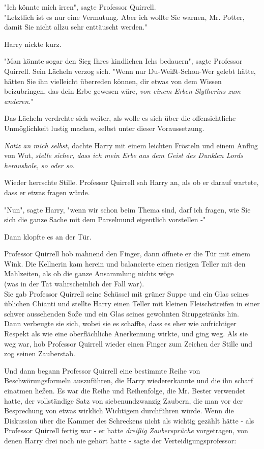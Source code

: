 {"Ich könnte mich irren", sagte Professor Quirrell.\\ "Letztlich ist es nur eine Vermutung. Aber ich wollte Sie warnen, Mr. Potter, damit Sie nicht allzu sehr enttäuscht werden."

Harry nickte kurz.

"Man könnte sogar den Sieg Ihres kindlichen Ichs bedauern", sagte Professor Quirrell. Sein Lächeln verzog sich. "Wenn nur Du-Weißt-Schon-Wer gelebt hätte, hätten Sie ihn vielleicht überreden können, dir etwas von dem Wissen beizubringen, das dein Erbe gewesen wäre, \emph{von einem Erben Slytherins zum anderen.}"

Das Lächeln verdrehte sich weiter, als wolle es sich über die offensichtliche Unmöglichkeit lustig machen, selbst unter dieser Voraussetzung.

\emph{Notiz an mich selbst,} dachte Harry mit einem leichten Frösteln und einem Anflug von Wut, \emph{stelle sicher, dass ich mein Erbe aus dem Geist des Dunklen Lords heraushole, so oder so.}

Wieder herrschte Stille. Professor Quirrell sah Harry an, als ob er darauf wartete, dass er etwas fragen würde.

"Nun", sagte Harry, "wenn wir schon beim Thema sind, darf ich fragen, wie Sie sich die ganze Sache mit dem Parselmund eigentlich vorstellen -"

Dann klopfte es an der Tür.

Professor Quirrell hob mahnend den Finger, dann öffnete er die Tür mit einem Wink. Die Kellnerin kam herein und balancierte einen riesigen Teller mit den Mahlzeiten, als ob die ganze Ansammlung nichts wöge\\ (was in der Tat wahrscheinlich der Fall war).\\ Sie gab Professor Quirrell seine Schüssel mit grüner Suppe und ein Glas seines üblichen Chianti und stellte Harry einen Teller mit kleinen Fleischstreifen in einer schwer aussehenden Soße und ein Glas seines gewohnten Sirupgetränks hin.\\ Dann verbeugte sie sich, wobei sie es schaffte, dass es eher wie aufrichtiger Respekt als wie eine oberflächliche Anerkennung wirkte, und ging weg. Als sie weg war, hob Professor Quirrell wieder einen Finger zum Zeichen der Stille und zog seinen Zauberstab.

Und dann begann Professor Quirrell eine bestimmte Reihe von Beschwörungsformeln auszuführen, die Harry wiedererkannte und die ihn scharf einatmen ließen. Es war die Reihe und Reihenfolge, die Mr. Bester verwendet hatte, der vollständige Satz von siebenundzwanzig Zaubern, die man vor der Besprechung von etwas wirklich Wichtigem durchführen würde. Wenn die Diskussion über die Kammer des Schreckens nicht als wichtig gezählt hätte - als Professor Quirrell fertig war - er hatte \emph{dreißig Zaubersprüche} vorgetragen, von denen Harry drei noch nie gehört hatte - sagte der Verteidigungsprofessor:

}
